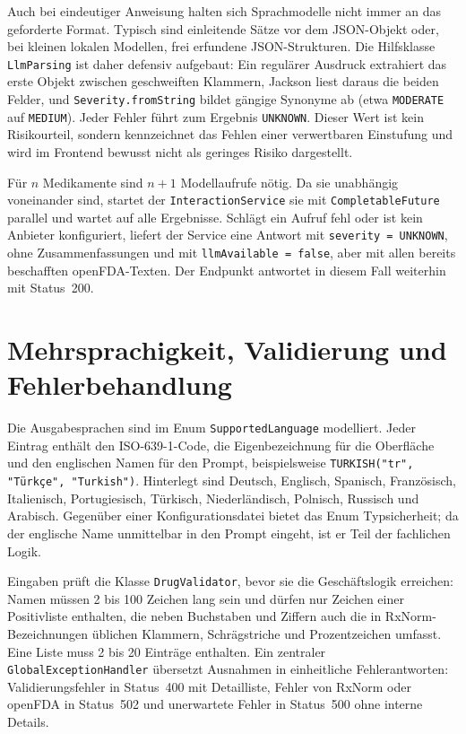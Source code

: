 Auch bei eindeutiger Anweisung halten sich Sprachmodelle nicht immer an das geforderte Format. Typisch sind einleitende Sätze vor dem JSON-Objekt oder, bei kleinen lokalen Modellen, frei erfundene JSON-Strukturen. Die Hilfsklasse \texttt{LlmParsing} ist daher defensiv aufgebaut: Ein regulärer Ausdruck extrahiert das erste Objekt zwischen geschweiften Klammern, Jackson liest daraus die beiden Felder, und \texttt{Severity.fromString} bildet gängige Synonyme ab (etwa \texttt{MODERATE} auf \texttt{MEDIUM}). Jeder Fehler führt zum Ergebnis \texttt{UNKNOWN}. Dieser Wert ist kein Risikourteil, sondern kennzeichnet das Fehlen einer verwertbaren Einstufung und wird im Frontend bewusst nicht als geringes Risiko dargestellt.

Für \(n\) Medikamente sind \(n+1\) Modellaufrufe nötig. Da sie unabhängig voneinander sind, startet der \texttt{InteractionService} sie mit \texttt{CompletableFuture} parallel und wartet auf alle Ergebnisse. Schlägt ein Aufruf fehl oder ist kein Anbieter konfiguriert, liefert der Service eine Antwort mit \texttt{severity = UNKNOWN}, ohne Zusammenfassungen und mit \texttt{llmAvailable = false}, aber mit allen bereits beschafften openFDA-Texten. Der Endpunkt antwortet in diesem Fall weiterhin mit Status~200.

\section{Mehrsprachigkeit, Validierung und Fehlerbehandlung}

Die Ausgabesprachen sind im Enum \texttt{SupportedLanguage} modelliert. Jeder Eintrag enthält den ISO-639-1-Code, die Eigenbezeichnung für die Oberfläche und den englischen Namen für den Prompt, beispielsweise \texttt{TURKISH("tr", "Türkçe", "Turkish")}. Hinterlegt sind Deutsch, Englisch, Spanisch, Französisch, Italienisch, Portugiesisch, Türkisch, Niederländisch, Polnisch, Russisch und Arabisch. Gegenüber einer Konfigurationsdatei bietet das Enum Typsicherheit; da der englische Name unmittelbar in den Prompt eingeht, ist er Teil der fachlichen Logik.

Eingaben prüft die Klasse \texttt{DrugValidator}, bevor sie die Geschäftslogik erreichen: Namen müssen 2 bis 100 Zeichen lang sein und dürfen nur Zeichen einer Positivliste enthalten, die neben Buchstaben und Ziffern auch die in RxNorm-Bezeichnungen üblichen Klammern, Schrägstriche und Prozentzeichen umfasst. Eine Liste muss 2 bis 20 Einträge enthalten. Ein zentraler \texttt{GlobalExceptionHandler} übersetzt Ausnahmen in einheitliche Fehlerantworten: Validierungsfehler in Status~400 mit Detailliste, Fehler von RxNorm oder openFDA in Status~502 und unerwartete Fehler in Status~500 ohne interne Details.

